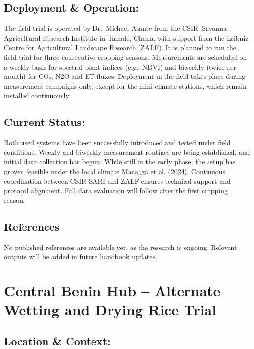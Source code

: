 \documentclass[
  11pt,
  letterpaper,
]{book}
\begin{document}
\subsection{Deployment \& Operation:}\label{sec-ghana-hub-deployment}

The field trial is operated by Dr.~Michael Asante from the CSIR--Savanna
Agricultural Research Institute in Tamale, Ghana, with support from the
Leibniz Centre for Agricultural Landscape Research (ZALF). It is planned
to run the field trial for three consecutive cropping seasons.
Measurements are scheduled on a weekly basis for spectral plant indices
(e.g., NDVI) and biweekly (twice per month) for CO₂, N2O and ET fluxes.
Deployment in the field takes place during measurement campaigns only,
except for the mini climate stations, which remain installed
continuously.

\subsection{Current Status:}\label{sec-ghana-hub-status}

Both used systems have been successfully introduced and tested under
field conditions. Weekly and biweekly measurement routines are being
established, and initial data collection has begun. While still in the
early phase, the setup has proven feasible under the local climate
Macagga et al. (2024). Continuous coordination between CSIR-SARI and
ZALF ensures technical support and protocol alignment. Full data
evaluation will follow after the first cropping season.

\subsection{References}\label{sec-ghana-hub-references}

No published references are available yet, as the research is ongoing.
Relevant outputs will be added in future handbook updates.

\section{Central Benin Hub -- Alternate Wetting and Drying Rice
Trial}\label{central-benin-hub-alternate-wetting-and-drying-rice-trial}

\subsection{Location \& Context:}\label{sec-benin-hub-location}
\end{document}

